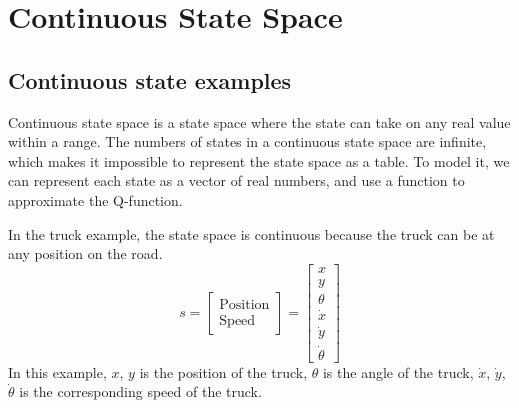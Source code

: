 \chapter{Continuous State Space}
\section{Continuous state examples}
Continuous state space is a state space where the state can take on any real value within a range.
The numbers of states in a continuous state space are infinite, which makes it impossible to represent the state space as a table.
To model it, we can represent each state as a vector of real numbers, and use a function to approximate the Q-function.

In the truck example, the state space is continuous because the truck can be at any position on the road.
\begin{equation*}
    s = \begin{bmatrix}
        \text{Position} \\
        \text{Speed}
    \end{bmatrix}
    = \begin{bmatrix}
        x\\
        y\\
        \theta\\
        \dot{x}\\
        \dot{y}\\
        \dot{\theta}
    \end{bmatrix}
\end{equation*}
In this example, $x$, $y$ is the position of the truck, 
$\theta$ is the angle of the truck, $\dot{x}$, $\dot{y}$, $\dot{\theta}$ 
is the corresponding speed of the truck.

